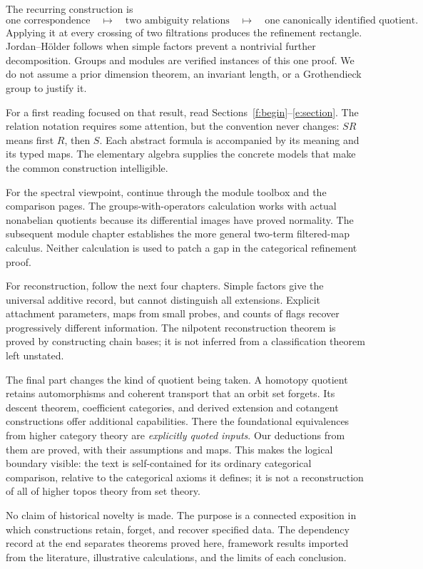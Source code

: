 \documentclass[11pt]{article}
\theoremstyle{definition}
\theoremstyle{remark}\newtheorem{remark}[theorem]{Remark}
\begin{document}
The recurring construction is
\[
 \text{one correspondence}
 \quad\longmapsto\quad
 \text{two ambiguity relations}
 \quad\longmapsto\quad
 \text{one canonically identified quotient}.
\]
Applying it at every crossing of two filtrations produces the refinement
rectangle. Jordan--H\"older follows when simple factors prevent a
nontrivial further decomposition. Groups and modules are verified
instances of this one proof. We do not assume a prior dimension theorem,
an invariant length, or a Grothendieck group to justify it.

For a first reading focused on that result, read
Sections~\ref{f:begin}--\ref{e:section}. The relation notation requires
some attention, but the convention never changes: $SR$ means first $R$,
then $S$. Each abstract formula is accompanied by its meaning and its
typed maps. The elementary algebra supplies the concrete models that make
the common construction intelligible.

For the spectral viewpoint, continue through the module toolbox and the
comparison pages. The groups-with-operators calculation works with actual
nonabelian quotients because its differential images have proved
normality. The subsequent module chapter establishes the more general
two-term filtered-map calculus. Neither calculation is used to patch a
gap in the categorical refinement proof.

For reconstruction, follow the next four chapters. Simple factors give
the universal additive record, but cannot distinguish all extensions.
Explicit attachment parameters, maps from small probes, and counts of
flags recover progressively different information. The nilpotent
reconstruction theorem is proved by constructing chain bases; it is not
inferred from a classification theorem left unstated.

The final part changes the kind of quotient being taken. A homotopy
quotient retains automorphisms and coherent transport that an orbit set
forgets. Its descent theorem, coefficient categories, and derived
extension and cotangent constructions offer additional capabilities.
There the foundational equivalences from higher category theory are
\emph{explicitly quoted inputs}. Our deductions from them are proved,
with their assumptions and maps. This makes the logical boundary visible:
the text is self-contained for its ordinary categorical comparison,
relative to the categorical axioms it defines; it is not a reconstruction
of all of higher topos theory from set theory.

No claim of historical novelty is made. The purpose is a connected
exposition in which constructions retain, forget, and recover specified
data. The dependency record at the end separates theorems proved here,
framework results imported from the literature, illustrative calculations,
and the limits of each conclusion.
\end{document}
